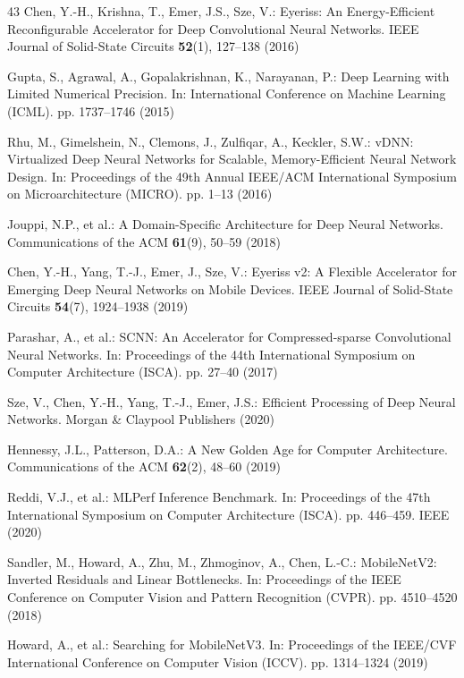 \documentclass[conference]{IEEEtran}
\begin{document}
\begin{thebibliography}{43}
Chen, Y.-H., Krishna, T., Emer, J.S., Sze, V.: Eyeriss: An Energy-Efficient Reconfigurable Accelerator for Deep Convolutional Neural Networks. IEEE Journal of Solid-State Circuits \textbf{52}(1), 127--138 (2016)

Gupta, S., Agrawal, A., Gopalakrishnan, K., Narayanan, P.: Deep Learning with Limited Numerical Precision. In: International Conference on Machine Learning (ICML). pp. 1737--1746 (2015)

Rhu, M., Gimelshein, N., Clemons, J., Zulfiqar, A., Keckler, S.W.: vDNN: Virtualized Deep Neural Networks for Scalable, Memory-Efficient Neural Network Design. In: Proceedings of the 49th Annual IEEE/ACM International Symposium on Microarchitecture (MICRO). pp. 1--13 (2016)

Jouppi, N.P., et al.: A Domain-Specific Architecture for Deep Neural Networks. Communications of the ACM \textbf{61}(9), 50--59 (2018)

Chen, Y.-H., Yang, T.-J., Emer, J., Sze, V.: Eyeriss v2: A Flexible Accelerator for Emerging Deep Neural Networks on Mobile Devices. IEEE Journal of Solid-State Circuits \textbf{54}(7), 1924--1938 (2019)

Parashar, A., et al.: SCNN: An Accelerator for Compressed-sparse Convolutional Neural Networks. In: Proceedings of the 44th International Symposium on Computer Architecture (ISCA). pp. 27--40 (2017)

Sze, V., Chen, Y.-H., Yang, T.-J., Emer, J.S.: Efficient Processing of Deep Neural Networks. Morgan \& Claypool Publishers (2020)

Hennessy, J.L., Patterson, D.A.: A New Golden Age for Computer Architecture. Communications of the ACM \textbf{62}(2), 48--60 (2019)

Reddi, V.J., et al.: MLPerf Inference Benchmark. In: Proceedings of the 47th International Symposium on Computer Architecture (ISCA). pp. 446--459. IEEE (2020)

Sandler, M., Howard, A., Zhu, M., Zhmoginov, A., Chen, L.-C.: MobileNetV2: Inverted Residuals and Linear Bottlenecks. In: Proceedings of the IEEE Conference on Computer Vision and Pattern Recognition (CVPR). pp. 4510--4520 (2018)

Howard, A., et al.: Searching for MobileNetV3. In: Proceedings of the IEEE/CVF International Conference on Computer Vision (ICCV). pp. 1314--1324 (2019)


\end{thebibliography}
\end{document}
